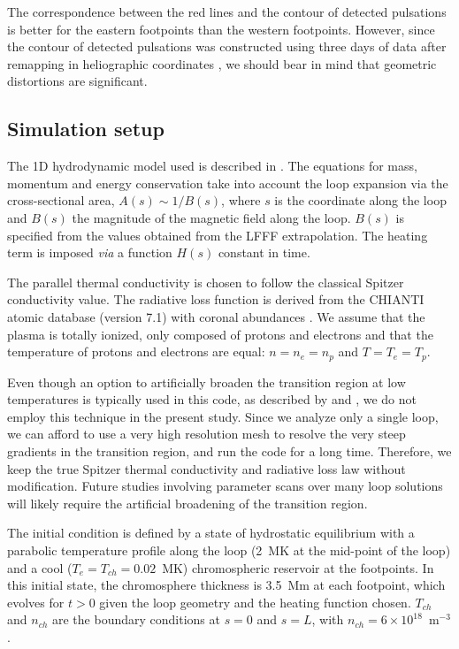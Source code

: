 \documentclass[preprint2]{aastex6}
\begin{document}
The correspondence between the red lines and the contour of detected pulsations is better for the eastern footpoints than the western footpoints. However, since the contour of detected pulsations was constructed using three days of data after remapping in heliographic coordinates \citep{froment2015}, we should bear in mind that geometric distortions are significant. 
 
\subsection{Simulation setup}
The 1D hydrodynamic model used is described in \citet[Section 2]{mikic2013}. The equations for mass, momentum and energy conservation take into account the loop expansion via the cross-sectional area, $A(s) \sim 1/B(s)$, where $s$ is the coordinate along the loop and $B(s)$ the magnitude of the magnetic field along the loop. 
$B(s)$ is specified from the values obtained from the LFFF extrapolation. The heating term is imposed \textit{via} a function $H(s)$ constant in time.

The parallel thermal conductivity is chosen to follow the classical Spitzer conductivity value. The radiative loss function is derived from the CHIANTI atomic database (version 7.1) \citep{dere1997,landi2013} with coronal abundances \citep{feldman_potential_1992,feldman_elemental_1992, grevesse1998, landi2002}. 
We assume that the plasma is totally ionized, only composed of protons and electrons and that the temperature of protons and electrons are equal: $n=n_e=n_p$ and $T=T_e=T_p$. 

Even though an option to artificially broaden the transition region at low temperatures is typically used in this code, as described by \citet{lionello2009} and \citet{mikic2013}, we do not employ this technique in the present study.  Since we analyze only a single loop, we can afford to use a very high resolution mesh to resolve the very steep gradients in the transition region, and run the code for a long time.  Therefore, we keep the true Spitzer thermal conductivity and radiative loss law without modification.  Future studies involving parameter scans over many loop solutions will likely require the artificial broadening of the transition region.

The initial condition is defined by a state of hydrostatic equilibrium with a parabolic temperature profile along the loop (2~MK at the mid-point of the loop) and a cool ($T_e=T_{ch} = 0.02$~MK) chromospheric reservoir at the footpoints. In this initial state, the chromosphere thickness is 3.5~Mm at each footpoint, which evolves for $t>0$ given the loop geometry and the heating function chosen. 
$T_{ch}$ and $n_{ch}$ are the boundary conditions at $s=0$ and $s=L$, with $n_{ch}=6 \times 10^{18}$~m$^{-3}$.
\end{document}
